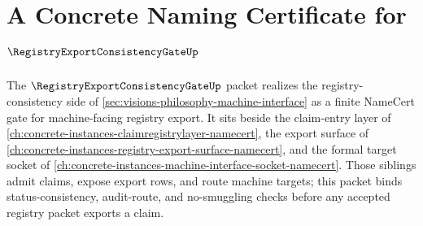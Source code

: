 \chapter{A Concrete Naming Certificate for $\RegistryExportConsistencyGateUp$}
\label{ch:concrete-instances-registry-export-consistency-gate-namecert}

The $\RegistryExportConsistencyGateUp$ packet realizes the registry-consistency side of \autoref{sec:visions-philosophy-machine-interface} as a finite NameCert gate for machine-facing registry export. It sits beside the claim-entry layer of \autoref{ch:concrete-instances-claimregistrylayer-namecert}, the export surface of \autoref{ch:concrete-instances-registry-export-surface-namecert}, and the formal target socket of \autoref{ch:concrete-instances-machine-interface-socket-namecert}. Those siblings admit claims, expose export rows, and route machine targets; this packet binds status-consistency, audit-route, and no-smuggling checks before any accepted registry packet exports a claim.

